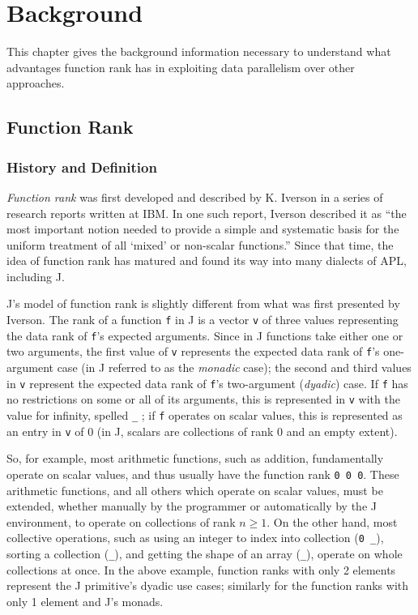 \chapter{Background}
\label{back}

This chapter gives the background information necessary to understand what advantages function rank has in exploiting data parallelism over other approaches.

\section{Function Rank}
\subsection{History and Definition}
\textit{Function rank} was first developed and described by K. Iverson in a series of research reports written at IBM. %
In one such report, Iverson described it as 
``the most important notion needed to provide a simple and systematic basis for the uniform treatment of all `mixed' or non-scalar functions.''\cite{rapl} %
Since that time, the idea of function rank has matured and found its way into many dialects of APL, including J.

J's model of function rank is slightly different from what was first presented by Iverson. \cite{rankanduni} \cite{jvocab}
The rank of a function \texttt{f} in J is a vector \texttt{v} of three values representing the data rank of \texttt{f}'s expected arguments.
Since in J functions take either one or two arguments, 
the first value of \texttt{v} represents the expected data rank of \texttt{f}'s one-argument case (in J referred to as the \textit{monadic} case);
the second and third values in \texttt{v} represent the expected data rank of \texttt{f}'s two-argument (\textit{dyadic}) case.
If \texttt{f} has no restrictions on some or all of its arguments, 
this is represented in \texttt{v} with the value for infinity, spelled \texttt{\_} ;
if \texttt{f} operates on scalar values, this is represented as an entry in \texttt{v} of 0 
(in J, scalars are collections of rank 0 and an empty extent). %

So, for example, most arithmetic functions, such as addition, 
fundamentally operate on scalar values, and thus usually have the function rank \texttt{0 0 0}.
These arithmetic functions, and all others which operate on scalar values, 
must be extended, whether manually by the programmer or automatically by the J environment, 
to operate on collections of rank $n \ge 1$.
On the other hand, most collective operations, such as using an integer to index into collection (\texttt{0 \_}), 
sorting a collection (\texttt{\_}), and getting the shape of an array (\texttt{\_}), operate on whole collections at once.
In the above example, function ranks with only 2 elements represent the J primitive's dyadic use cases; 
similarly for the function ranks with only 1 element and J's monads. %

